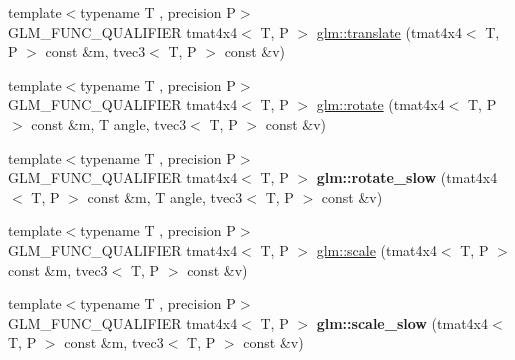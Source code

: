 \begin{DoxyCompactItemize}
\item 
{\footnotesize template$<$typename T , precision P$>$ }\\G\-L\-M\-\_\-\-F\-U\-N\-C\-\_\-\-Q\-U\-A\-L\-I\-F\-I\-E\-R tmat4x4$<$ T, P $>$ \hyperlink{group__gtc__matrix__transform_gaee134ab77c6c5548a6ebf4e8e476c6ed}{glm\-::translate} (tmat4x4$<$ T, P $>$ const \&m, tvec3$<$ T, P $>$ const \&v)
\item 
{\footnotesize template$<$typename T , precision P$>$ }\\G\-L\-M\-\_\-\-F\-U\-N\-C\-\_\-\-Q\-U\-A\-L\-I\-F\-I\-E\-R tmat4x4$<$ T, P $>$ \hyperlink{group__gtc__matrix__transform_ga161b1df124348f232d994ba7958e4815}{glm\-::rotate} (tmat4x4$<$ T, P $>$ const \&m, T angle, tvec3$<$ T, P $>$ const \&v)
\item 
\hypertarget{namespaceglm_a9fbbd196726ba74b00b82b9a3d48487f}{{\footnotesize template$<$typename T , precision P$>$ }\\G\-L\-M\-\_\-\-F\-U\-N\-C\-\_\-\-Q\-U\-A\-L\-I\-F\-I\-E\-R tmat4x4$<$ T, P $>$ {\bfseries glm\-::rotate\-\_\-slow} (tmat4x4$<$ T, P $>$ const \&m, T angle, tvec3$<$ T, P $>$ const \&v)}\label{namespaceglm_a9fbbd196726ba74b00b82b9a3d48487f}

\item 
{\footnotesize template$<$typename T , precision P$>$ }\\G\-L\-M\-\_\-\-F\-U\-N\-C\-\_\-\-Q\-U\-A\-L\-I\-F\-I\-E\-R tmat4x4$<$ T, P $>$ \hyperlink{group__gtc__matrix__transform_ga8f062fcc07e2445500793f2803afebb0}{glm\-::scale} (tmat4x4$<$ T, P $>$ const \&m, tvec3$<$ T, P $>$ const \&v)
\item 
\hypertarget{namespaceglm_afae64498e6edd7aa501c1a7fa071f779}{{\footnotesize template$<$typename T , precision P$>$ }\\G\-L\-M\-\_\-\-F\-U\-N\-C\-\_\-\-Q\-U\-A\-L\-I\-F\-I\-E\-R tmat4x4$<$ T, P $>$ {\bfseries glm\-::scale\-\_\-slow} (tmat4x4$<$ T, P $>$ const \&m, tvec3$<$ T, P $>$ const \&v)}\label{namespaceglm_afae64498e6edd7aa501c1a7fa071f779}


\end{DoxyCompactItemize}
